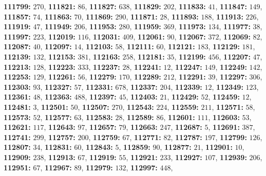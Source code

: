\textsf{\bfseries 111799:} $270$, \textsf{\bfseries 111821:} $86$, \textsf{\bfseries 111827:} $638$, \textsf{\bfseries 111829:} $202$, \textsf{\bfseries 111833:} $41$, \textsf{\bfseries 111847:} $149$, \textsf{\bfseries 111857:} $74$, \textsf{\bfseries 111863:} $70$, \textsf{\bfseries 111869:} $290$, \textsf{\bfseries 111871:} $28$, \textsf{\bfseries 111893:} $188$, \textsf{\bfseries 111913:} $226$, \textsf{\bfseries 111919:} $47$, \textsf{\bfseries 111949:} $206$, \textsf{\bfseries 111953:} $280$, \textsf{\bfseries 111959:} $369$, \textsf{\bfseries 111973:} $134$, \textsf{\bfseries 111977:} $38$, \textsf{\bfseries 111997:} $223$, \textsf{\bfseries 112019:} $116$, \textsf{\bfseries 112031:} $409$, \textsf{\bfseries 112061:} $90$, \textsf{\bfseries 112067:} $372$, \textsf{\bfseries 112069:} $82$, \textsf{\bfseries 112087:} $40$, \textsf{\bfseries 112097:} $14$, \textsf{\bfseries 112103:} $58$, \textsf{\bfseries 112111:} $60$, \textsf{\bfseries 112121:} $183$, \textsf{\bfseries 112129:} $181$, \textsf{\bfseries 112139:} $132$, \textsf{\bfseries 112153:} $381$, \textsf{\bfseries 112163:} $258$, \textsf{\bfseries 112181:} $35$, \textsf{\bfseries 112199:} $456$, \textsf{\bfseries 112207:} $47$, \textsf{\bfseries 112213:} $128$, \textsf{\bfseries 112223:} $333$, \textsf{\bfseries 112237:} $28$, \textsf{\bfseries 112241:} $12$, \textsf{\bfseries 112247:} $149$, \textsf{\bfseries 112249:} $142$, \textsf{\bfseries 112253:} $129$, \textsf{\bfseries 112261:} $56$, \textsf{\bfseries 112279:} $170$, \textsf{\bfseries 112289:} $212$, \textsf{\bfseries 112291:} $39$, \textsf{\bfseries 112297:} $306$, \textsf{\bfseries 112303:} $93$, \textsf{\bfseries 112327:} $57$, \textsf{\bfseries 112331:} $678$, \textsf{\bfseries 112337:} $204$, \textsf{\bfseries 112339:} $12$, \textsf{\bfseries 112349:} $123$, \textsf{\bfseries 112361:} $48$, \textsf{\bfseries 112363:} $488$, \textsf{\bfseries 112397:} $45$, \textsf{\bfseries 112403:} $21$, \textsf{\bfseries 112429:} $52$, \textsf{\bfseries 112459:} $12$, \textsf{\bfseries 112481:} $3$, \textsf{\bfseries 112501:} $50$, \textsf{\bfseries 112507:} $270$, \textsf{\bfseries 112543:} $224$, \textsf{\bfseries 112559:} $211$, \textsf{\bfseries 112571:} $58$, \textsf{\bfseries 112573:} $52$, \textsf{\bfseries 112577:} $63$, \textsf{\bfseries 112583:} $28$, \textsf{\bfseries 112589:} $86$, \textsf{\bfseries 112601:} $111$, \textsf{\bfseries 112603:} $53$, \textsf{\bfseries 112621:} $117$, \textsf{\bfseries 112643:} $97$, \textsf{\bfseries 112657:} $79$, \textsf{\bfseries 112663:} $247$, \textsf{\bfseries 112687:} $5$, \textsf{\bfseries 112691:} $387$, \textsf{\bfseries 112741:} $299$, \textsf{\bfseries 112757:} $200$, \textsf{\bfseries 112759:} $67$, \textsf{\bfseries 112771:} $82$, \textsf{\bfseries 112787:} $197$, \textsf{\bfseries 112799:} $126$, \textsf{\bfseries 112807:} $34$, \textsf{\bfseries 112831:} $60$, \textsf{\bfseries 112843:} $5$, \textsf{\bfseries 112859:} $90$, \textsf{\bfseries 112877:} $21$, \textsf{\bfseries 112901:} $10$, \textsf{\bfseries 112909:} $238$, \textsf{\bfseries 112913:} $67$, \textsf{\bfseries 112919:} $55$, \textsf{\bfseries 112921:} $233$, \textsf{\bfseries 112927:} $107$, \textsf{\bfseries 112939:} $206$, \textsf{\bfseries 112951:} $67$, \textsf{\bfseries 112967:} $89$, \textsf{\bfseries 112979:} $132$, \textsf{\bfseries 112997:} $448$, 
